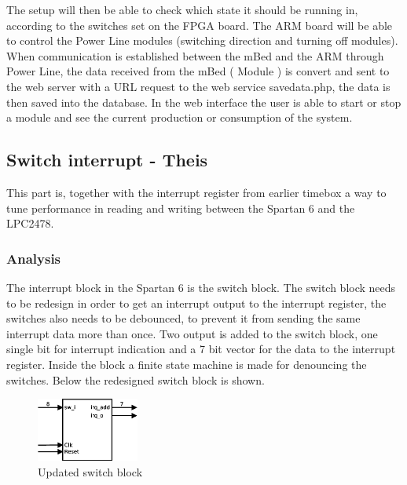 The setup will then be able to check which state it should be running in, according to the switches set on the FPGA board. The ARM board will be able to control the Power Line modules (switching direction and turning off modules). When communication is established between the mBed and the ARM through Power Line, the data received from the mBed ( Module ) is convert and sent to the web server with a URL request to the web service savedata.php, the data is then saved into the database.
In the web interface the user is able to start or stop a module and see the current production or consumption of the system.

\subsection{Switch interrupt - Theis}
\label{sec:Switch interrupt}
%
This part is, together with the interrupt register from earlier timebox a way to tune performance in reading and writing between the Spartan 6 and the LPC2478.
\subsubsection{Analysis}
%
%
The interrupt block in the Spartan 6 is the switch block. The switch block needs to be redesign in order to get an interrupt output to the interrupt register, the switches also needs to be debounced, to prevent it from sending the same interrupt data more than once. Two output is added to the switch block, one single bit for interrupt indication and a 7 bit vector for the data to the interrupt register. Inside the block a finite state machine is made for denouncing the switches. Below the redesigned switch block is shown.

\begin{figure}[H]
	\begin{centering}
		\includegraphics[width=0.3\textwidth]{images/tb6_switchblock.eps}
		\caption{Updated switch block}
	\end{centering}
\end{figure}


